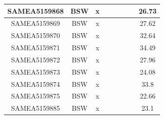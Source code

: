 \documentclass[../main.tex]{subfiles}
\begin{document}
\begin{flushleft}
\begin{footnotesize}
\begin{longtable}{|c|c|c|c|c|c|c|}
    \hline
    SAMEA5159868  & BSW   & x                                                            & ~          & ~                                                                           & ~                                                                 & 26.73     \\ 
    \hline
    SAMEA5159869  & BSW   & x                                                            & ~          & ~                                                                           & ~                                                                 & 27.62     \\ 
    \hline
    SAMEA5159870  & BSW   & x                                                            & ~          & ~                                                                           & ~                                                                 & 32.64     \\ 
    \hline
    SAMEA5159871  & BSW   & x                                                            & ~          & ~                                                                           & ~                                                                 & 34.49     \\ 
    \hline
    SAMEA5159872  & BSW   & x                                                            & ~          & ~                                                                           & ~                                                                 & 27.96     \\ 
    \hline
    SAMEA5159873  & BSW   & x                                                            & ~          & ~                                                                           & ~                                                                 & 24.08     \\ 
    \hline
    SAMEA5159874  & BSW   & x                                                            & ~          & ~                                                                           & ~                                                                 & 33.8      \\ 
    \hline
    SAMEA5159875  & BSW   & x                                                            & ~          & ~                                                                           & ~                                                                 & 22.66     \\ 
    \hline
    SAMEA5159885  & BSW   & x                                                            & ~          & ~                                                                           & ~                                                                 & 23.1      \\ 

\end{longtable}
\end{footnotesize}
\end{flushleft}
\end{document}
